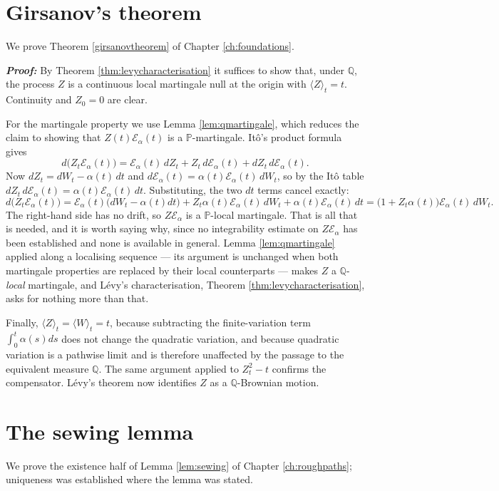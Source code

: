 \section{Girsanov's theorem}\label{app:proof:girsanov}
We prove Theorem \ref{girsanovtheorem} of Chapter \ref{ch:foundations}.

\textbf{\textit{Proof:}} By Theorem \ref{thm:levycharacterisation} it suffices to show that, under
$\mathbb{Q}$, the process $Z$ is a continuous local martingale null at the origin with
$\langle Z\rangle_t = t$. Continuity and $Z_0=0$ are clear.

For the martingale property we use Lemma \ref{lem:qmartingale}, which reduces the claim to showing that
$Z(t)\mathcal{E}_\alpha(t)$ is a $\mathbb{P}$-martingale. Itô's product formula gives
\[
d\bigl(Z_t\mathcal{E}_\alpha(t)\bigr)
= \mathcal{E}_\alpha(t)\,dZ_t + Z_t\,d\mathcal{E}_\alpha(t) + dZ_t\,d\mathcal{E}_\alpha(t) .
\]
Now $dZ_t = dW_t - \alpha(t)\,dt$ and $d\mathcal{E}_\alpha(t) = \alpha(t)\mathcal{E}_\alpha(t)\,dW_t$,
so by the Itô table $dZ_t\,d\mathcal{E}_\alpha(t) = \alpha(t)\mathcal{E}_\alpha(t)\,dt$. Substituting,
the two $dt$ terms cancel exactly:
\[
d\bigl(Z_t\mathcal{E}_\alpha(t)\bigr)
= \mathcal{E}_\alpha(t)\bigl(dW_t - \alpha(t)dt\bigr) + Z_t\alpha(t)\mathcal{E}_\alpha(t)\,dW_t
+ \alpha(t)\mathcal{E}_\alpha(t)\,dt
= \bigl(1 + Z_t\alpha(t)\bigr)\mathcal{E}_\alpha(t)\,dW_t .
\]
The right-hand side has no drift, so $Z\mathcal{E}_\alpha$ is a $\mathbb{P}$-local martingale. That
is all that is needed, and it is worth saying why, since no integrability estimate on
$Z\mathcal{E}_\alpha$ has been established and none is available in general. Lemma
\ref{lem:qmartingale} applied along a localising sequence --- its argument is unchanged when both
martingale properties are replaced by their local counterparts --- makes $Z$ a
$\mathbb{Q}$-\emph{local} martingale, and L\'evy's characterisation, Theorem
\ref{thm:levycharacterisation}, asks for nothing more than that.

Finally, $\langle Z\rangle_t = \langle W\rangle_t = t$, because subtracting the finite-variation term
$\int_0^t\alpha(s)ds$ does not change the quadratic variation, and because quadratic variation is a
pathwise limit and is therefore unaffected by the passage to the equivalent measure $\mathbb{Q}$. The
same argument applied to $Z^2_t - t$ confirms the compensator. Lévy's theorem now identifies $Z$ as a
$\mathbb{Q}$-Brownian motion. \qedfilledtext

\section{The sewing lemma}\label{app:proof:sewing}
We prove the existence half of Lemma \ref{lem:sewing} of Chapter \ref{ch:roughpaths}; uniqueness was
established where the lemma was stated.

